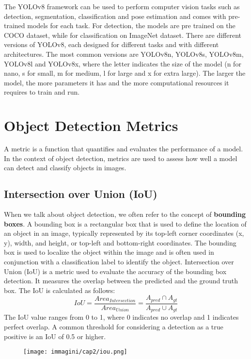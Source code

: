 The YOLOv8 framework can be used to perform computer vision tasks such as detection, segmentation, classification and pose estimation and comes with pre-trained models for each task. For detection, the models are pre trained on the COCO dataset, while for classification on ImageNet dataset. 
There are different versions of YOLOv8, each designed for different tasks and with different architectures. The most common versions are YOLOv8n, YOLOv8s, YOLOv8m, YOLOv8l and YOLOv8x, where the letter indicates the size of the model (n for nano, s for small, m for medium, l for large and x for extra large). The larger the model, the more parameters it has and the more computational resources it requires to train and run.

\section{Object Detection Metrics}
A metric is a function that quantifies and evaluates the performance of a model. In the context of object detection, metrics are used to assess how well a model can detect and classify objects in images. 

\subsection*{Intersection over Union (IoU)}
When we talk about object detection, we often refer to the concept of \textbf{bounding boxes}. A bounding box is a rectangular box that is used to define the location of an object in an image, typically represented by its top-left corner coordinates (x, y), width, and height, or top-left and bottom-right coordinates. The bounding box is used to localize the object within the image and is often used in conjunction with a classification label to identify the object.
Intersection over Union (IoU) is a metric used to evaluate the accuracy of the bounding box detection. It measures the overlap between the predicted and the ground truth box. The IoU is calculated as follows:
\begin{equation}
    IoU = \frac{Area_{Intersection}}{Area_{Union}} = \frac{A_{pred} \cap A_{gt}}{A_{pred} \cup A_{gt}}
\end{equation}
The IoU value ranges from 0 to 1, where 0 indicates no overlap and 1 indicates perfect overlap. A common threshold for considering a detection as a true positive is an IoU of 0.5 or higher.


\begin{figure}[htbp]
    \centering
    \texttt{[image: immagini/cap2/iou.png]}
    \caption{}
    \label{fig:iou}
\end{figure}

